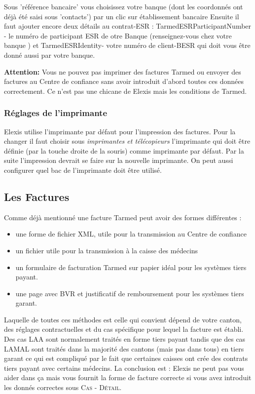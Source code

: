 Sous 'référence bancaire' vous choisissez votre banque (dont les coordonnés ont déjà été saisi sous 'contacts') par un clic sur  \glqq
établissement bancaire\grqq{}   Ensuite il faut ajouter encore deux détails au contrat-ESR : TarmedESRParticipantNumber - le numéro de participant ESR de otre Banque (renseignez-vous chez votre banque ) et TarmedESRIdentity- votre numéro de client-BESR qui doit vous être donné aussi par votre banque.

\textbf{Attention:} Vous ne pouvez pas imprimer des factures Tarmed ou envoyer des factures au Centre de confiance sans avoir introduit d'abord toutes ces données correctement. Ce n'est pas une chicane de Elexis mais les conditions de Tarmed.

\subsubsection{Réglages de l'imprimante}

Elexis utilise l'imprimante par défaut pour l'impression des factures. Pour la changer il faut choisir sous  \textit{imprimantes et télécopieurs } l'imprimante qui doit être définie (par la touche droite de la souris) comme imprimante par défaut.
Par la suite l'impression devrait se faire sur la nouvelle imprimante. On peut aussi configurer quel bac de l'imprimante doit être utilisé.

\subsection{Les Factures}

Comme déjà mentionné une facture Tarmed peut avoir des formes différentes :

\begin{itemize}
 \item une forme de fichier XML, utile pour la transmission au Centre de confiance
\item un fichier utile pour la transmission à la caisse des médecins
\item un formulaire de facturation Tarmed sur papier idéal pour les systèmes tiers payant.
\item  une page avec BVR et justificatif de remboursement pour les systèmes tiers garant.
\end{itemize}

Laquelle de toutes ces méthodes est celle qui convient dépend de votre canton, des réglages contractuelles et du cas spécifique pour lequel la facture est établi. Des cas LAA sont normalement traités en forme tiers payant tandis que des cas LAMAL sont traités dans la majorité des cantons (mais pas dans tous) en tiers garant ce qui est compliqué par le fait que certaines caisses ont crée des contrats tiers payant avec certains médecins. La conclusion est : Elexis ne peut pas vous aider dans ça mais vous fournit la forme de facture correcte si vous avez introduit les donnés correctes sous \textsc{Cas - Détail}.

